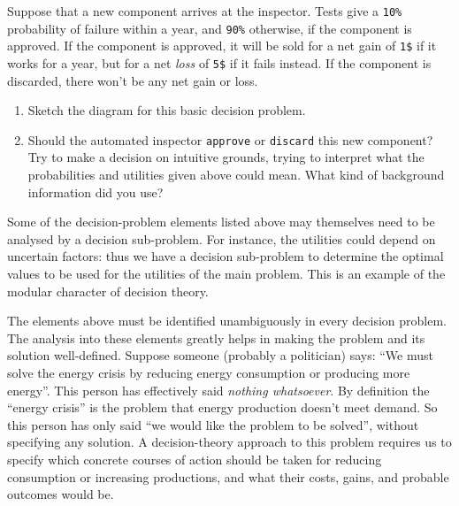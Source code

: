\documentclass[
  a4paper,
  DIV=11,
  numbers=noendperiod,
  oneside]{scrreprt}
\begin{document}
\begin{tcolorbox}[enhanced jigsaw, rightrule=.15mm, colbacktitle=quarto-callout-caution-color!10!white, coltitle=black, titlerule=0mm, title={Exercise}, colback=white, bottomrule=.15mm, toptitle=1mm, opacitybacktitle=0.6, toprule=.15mm, arc=.35mm, bottomtitle=1mm, colframe=quarto-callout-caution-color-frame, breakable, left=2mm, opacityback=0, leftrule=.75mm]

Suppose that a new component arrives at the inspector. Tests give a
\texttt{10\%} probability of failure within a year, and \texttt{90\%}
otherwise, if the component is approved. If the component is approved,
it will be sold for a net gain of \texttt{1\$} if it works for a year,
but for a net \emph{loss} of \texttt{5\$} if it fails instead. If the
component is discarded, there won't be any net gain or loss.

\begin{enumerate}
\def\labelenumi{\arabic{enumi}.}
\item
  Sketch the diagram for this basic decision problem.
\item
  Should the automated inspector \texttt{approve} or \texttt{discard}
  this new component? Try to make a decision on intuitive grounds,
  trying to interpret what the probabilities and utilities given above
  could mean. What kind of background information did you use?
\end{enumerate}

\end{tcolorbox}

Some of the decision-problem elements listed above may themselves need
to be analysed by a decision sub-problem. For instance, the utilities
could depend on uncertain factors: thus we have a decision sub-problem
to determine the optimal values to be used for the utilities of the main
problem. This is an example of the modular character of decision theory.

The elements above must be identified unambiguously in every decision
problem. The analysis into these elements greatly helps in making the
problem and its solution well-defined. Suppose someone (probably a
politician) says: ``We must solve the energy crisis by reducing energy
consumption or producing more energy''. This person has effectively said
\emph{nothing whatsoever}. By definition the ``energy crisis'' is the
problem that energy production doesn't meet demand. So this person has
only said ``we would like the problem to be solved'', without specifying
any solution. A decision-theory approach to this problem requires us to
specify which concrete courses of action should be taken for reducing
consumption or increasing productions, and what their costs, gains, and
probable outcomes would be.
\end{document}
